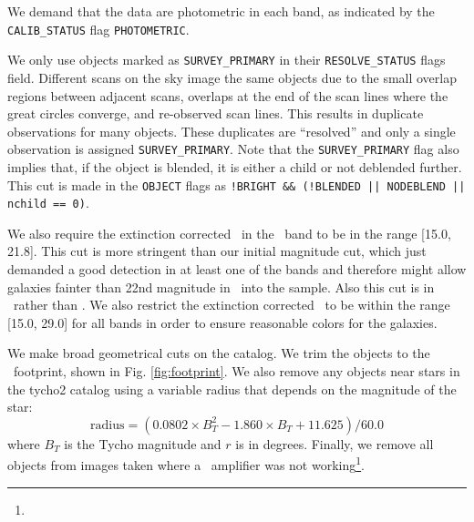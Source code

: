 \documentclass[12pt,preprint]{aastex}
\newcommand{\modelrmin}{15.0}
\newcommand{\modelrmax}{29.0}
\newcommand{\rmin}{15.0}
\newcommand{\rmax}{21.8}
\begin{document}
We demand that the data are photometric in each band, as indicated by
the \texttt{CALIB\_STATUS} flag \texttt{PHOTOMETRIC}.

We only use objects marked as \texttt{SURVEY\_PRIMARY} in their
\texttt{RESOLVE\_STATUS} flags field. Different scans on the sky image the same
objects due to the small overlap regions between adjacent scans, overlaps at
the end of the scan lines where the great circles converge, and re-observed
scan lines.  This results in duplicate observations for many objects.  These
duplicates are ``resolved'' and only a single observation is assigned
\texttt{SURVEY\_PRIMARY}.  Note that the \texttt{SURVEY\_PRIMARY} flag also implies
that, if the object is blended, it is either a child or not deblended further.
This cut is made in the \texttt{OBJECT} flags as \texttt{!BRIGHT \&\& (!BLENDED
|| NODEBLEND || nchild == 0)}.

We also require the extinction corrected \citep{Schlegel98} \cmodelmag\ in the
\rmag\ band to be in the range [\rmin, \rmax].   This cut is more stringent
than our initial magnitude cut, which just demanded a good detection in at
least one of the bands and therefore might allow galaxies fainter than 22nd
magnitude in \rmag\ into the sample. Also this cut is in \cmodelmag\ rather
than \modelmag.  We also restrict the extinction corrected \modelmag\ to be
within the range [\modelrmin, \modelrmax] for all bands in order to ensure
reasonable colors for the galaxies.


We make broad geometrical cuts on the catalog.  We trim the objects to the
\boss\ footprint, shown in Fig. \ref{fig:footprint}. We also remove any
objects near stars in the tycho2 catalog \citep{tycho2} using a variable radius
that depends on the magnitude of the star:
\begin{equation}
\textrm{radius} = (0.0802\times B_T^2 - 1.860\times B_T + 11.625)/60.0
\end{equation}
where $B_T$ is the Tycho magnitude and $r$ is in degrees\citep{blanton05a}.
Finally, we remove all objects from images taken where a \umag\ amplifier was
not working\footnote{\DRsevcaveat}.
\end{document}
